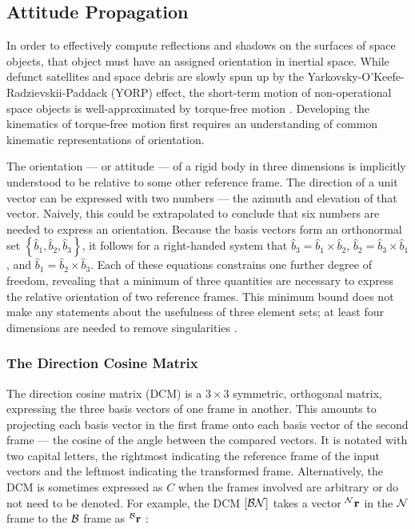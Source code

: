 \subsection{Attitude Propagation}

In order to effectively compute reflections and shadows on the surfaces of space objects, that object must have an assigned orientation in inertial space. While defunct satellites and space debris are slowly spun up by the Yarkovsky-O'Keefe-Radzievskii-Paddack (YORP) effect, the short-term motion of non-operational space objects is well-approximated by torque-free motion \cite{benson2018cyclic}. Developing the kinematics of torque-free motion first requires an understanding of common kinematic representations of orientation.

The orientation --- or attitude --- of a rigid body in three dimensions is implicitly understood to be relative to some other reference frame. The direction of a unit vector can be expressed with two numbers ---  the azimuth and elevation of that vector. Naively, this could be extrapolated to conclude that six numbers are needed to express an orientation. Because the basis vectors form an orthonormal set $\left\{ \hat{b}_1, \hat{b}_2, \hat{b}_3\right\}$, it follows for a right-handed system that $\hat{b}_3 = \hat{b}_1 \times \hat{b}_2$, $\hat{b}_2 = \hat{b}_3 \times \hat{b}_1$, and $\hat{b}_1 = \hat{b}_2 \times \hat{b}_3$. Each of these equations constrains one further degree of freedom, revealing that a minimum of three quantities are necessary to express the relative orientation of two reference frames. This minimum bound does not make any statements about the usefulness of three element sets; at least four dimensions are needed to remove singularities \cite{crassidis1ed}.

\subsubsection{The Direction Cosine Matrix}

The direction cosine matrix (DCM) is a $3\times3$ symmetric, orthogonal matrix, expressing the three basis vectors of one frame in another. This amounts to projecting each basis vector in the first frame onto each basis vector of the second frame --- the cosine of the angle between the compared vectors. It is notated with two capital letters, the rightmost indicating the reference frame of the input vectors and the leftmost indicating the transformed frame. Alternatively, the DCM is sometimes expressed as $C$ when the frames involved are arbitrary or do not need to be denoted. For example, the DCM $\dcm{bn}$ takes a vector $\vrf{n}{r}$ in the $\rf{n}$ frame to the $\rf{b}$ frame as $\vrf{b}{r}$ \cite{shuster1993}:

